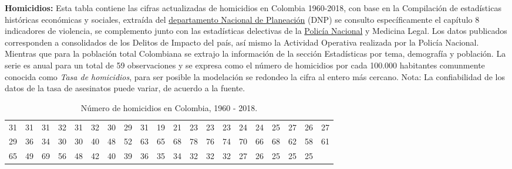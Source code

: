\documentclass[a4paper]{article}\usepackage[]{graphicx}\usepackage[]{color}
\begin{document}
\textbf{Homicidios:} Esta tabla contiene las cifras actualizadas de homicidios en Colombia 1960-2018, con base en la Compilación de estadísticas históricas económicas y sociales, extraída del \href{https://www.dnp.gov.co/estudios-y-publicaciones/estudios-economicos/Paginas/estadisticas-historicas-de-colombia.aspx}{departamento Nacional de Planeación} (DNP) se consulto específicamente el capítulo 8 indicadores de violencia, se complemento junto con las estadísticas delectivas de la \href{https://www.policia.gov.co/grupo-información-criminalidad/estadistica-delictiva}{Policía Nacional} y Medicina Legal. Los datos publicados corresponden a consolidados de los Delitos de Impacto del país, así mismo la Actividad Operativa realizada por la Policía Nacional. Mientras que para la población total Colombiana se extrajo la información de la sección Estadísticas por tema, demografía y población. La serie es anual para un total de 59 observaciones y se expresa como el número de homicidios por cada 100.000 habitantes comunmente conocida como \emph{Tasa de homicidios}, para ser posible la modelación se redondeo la cifra al entero más cercano. Nota: La confiabilidad de los datos de la tasa de asesinatos puede variar, de acuerdo a la fuente.

\begin{table}[ht]
\centering
\begin{tabular}{rrrrrrrrrrrrrrrrrrrr}
  \hline
  \hline
31 & 31 & 31 & 32 & 31 & 32 & 30 & 29 & 31 & 19 & 21 & 23 & 23 & 23 & 24 & 24 & 25 & 27 & 26 & 27 \\ 
  29 & 36 & 34 & 30 & 30 & 40 & 48 & 52 & 63 & 65 & 68 & 78 & 76 & 74 & 70 & 66 & 68 & 62 & 58 & 61 \\ 
  65 & 49 & 69 & 56 & 48 & 42 & 40 & 39 & 36 & 35 & 34 & 32 & 32 & 32 & 27 & 26 & 25 & 25 & 25 &  \\ 
   \hline
\end{tabular}
\caption{Número de homicidios en Colombia, 1960 - 2018.} 
\end{table}


\vspace{5mm} %
\end{document}
